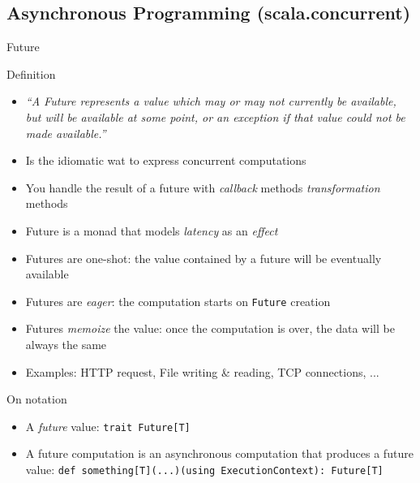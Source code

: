 \documentclass[presentation, 9pt]{beamer}\mode<presentation>{\usetheme{AMSBolognaFC}}
\begin{document}
\subsection{Asynchronous Programming (scala.concurrent)}
\begin{frame}[fragile]{Future}
	\begin{alertblock}{Definition}
		\centering
		\begin{itemize}
			\item \emph{“A Future represents a value which may or may not currently be available, but will be available at some point, or an exception if that value could not be made available.”}
		\end{itemize}
	\end{alertblock}
\begin{itemize}
 \item Is the idiomatic wat to express concurrent computations
 \item You handle the result of a future with \emph{callback} methods \emph{transformation} methods
 \item Future is a monad that models \emph{latency} as an \emph{effect}
 \item Futures are one-shot: the value contained by a future will be eventually available
 \item Futures are \emph{eager}: the computation starts on \texttt{Future} creation
 \item Futures \emph{memoize} the value: once the computation is over, the data will be always the same
 \item Examples: HTTP request, File writing \& reading, TCP connections, ...
\end{itemize}
\begin{alertblock}{On notation}
	\begin{itemize}
		\item A \emph{future} value: \texttt{trait Future[T]}
  	\item A future computation is an asynchronous computation that produces a future value: \texttt{def something[T](...)(using ExecutionContext): Future[T]}
	\end{itemize}
\end{alertblock}
\end{frame}
\end{document}
